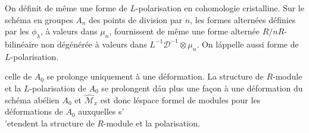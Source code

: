 \documentclass[11pt,a4paper]{article}
\theoremstyle{plain}
\theoremstyle{definition}
\begin{document}
On d\'efinit de m\^eme une forme de $L$-polarisation en cohomologie cristalline.
Sur le sch\'ema en groupes $A_n$ des points de division par $n$, les formes altern\'ees
d\'efinies par les $\phi_\lambda$, \`a valeurs dans $\mu_n$, fournissent de m\^eme une forme altern\'ee
$R/nR$-bilin\'eaire non d\'eg\'en\'er\'ee \`a valeurs dans $L^{-1}\mathscr{D}^{-1} \otimes \mu_n$. On l\'appelle aussi
forme de $L$-polarisation.


celle de $A_0$ se prolonge uniquement \`a une d\'eformation. La structure de
$R$-module et la $L$-polarisation de $A_0$ se prolongent d\'au plus une fa\c{c}on \`a une
d\'eformation du sch\'ema ab\'elien $A_0$ et $\hat{\mathscr{M}}_x$ est donc l\'espace formel de modules
pour les d\'eformations de $A_0$ auxquelles s'\\'etendent la structure de $R$-module et
la polarisation.

\subsection{}
\end{document}
